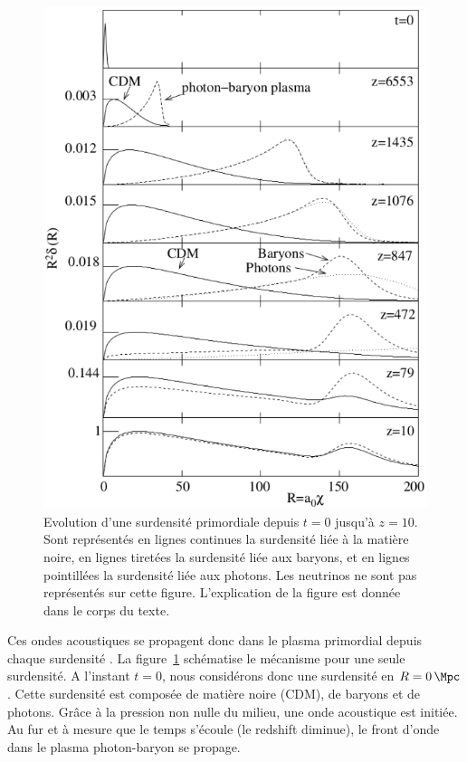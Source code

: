 \documentclass[11pt, twoside, a4paper, openright]{report}
\begin{document}
\begin{figure}
  \centering
  \includegraphics[scale=0.5]{bao_schema}
  \caption{Evolution d'une surdensité primordiale depuis $t=0$ jusqu'à $z=10$. Sont représentés en lignes continues la surdensité liée à la matière noire, en lignes tiretées la surdensité liée aux baryons, et en lignes pointillées la surdensité liée aux photons. Les neutrinos ne sont pas représentés sur cette figure. L'explication de la figure est donnée dans le corps du texte.}
  \label{fig:bao_schema}
\end{figure}
Ces ondes acoustiques se propagent donc dans le plasma primordial depuis chaque surdensité . La figure~\ref{fig:bao_schema} schématise le mécanisme pour une seule surdensité. A l'instant $t=0$, nous considérons donc une surdensité en $R = \SI{0}{\Mpc}$. Cette surdensité est composée de matière noire (CDM), de baryons et de photons.
Grâce à la pression non nulle du milieu, une onde acoustique est initiée. 
Au fur et à mesure que le temps s'écoule (le redshift diminue), le front d'onde dans le plasma photon-baryon se propage.
\end{document}
